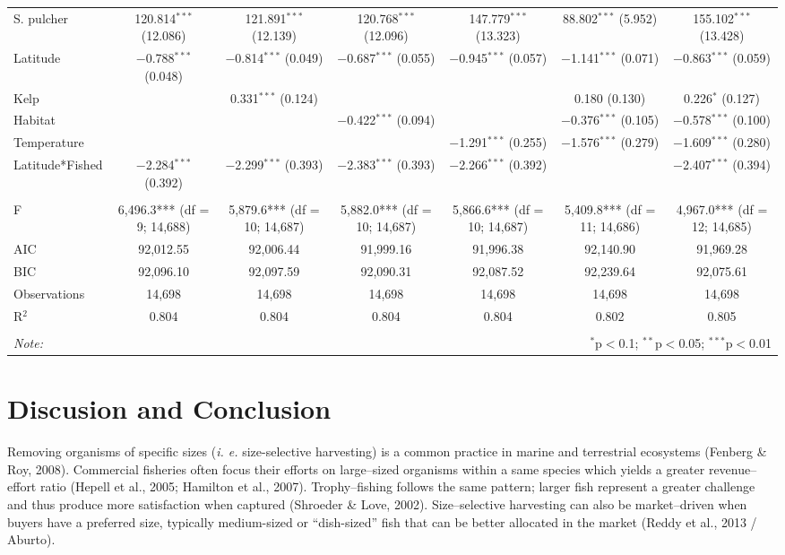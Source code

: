 \documentclass[12pt,]{article}
\begin{document}
\begin{landscape}
\begin{table}[!htbp]
\begin{tabular}{@{\extracolsep{5pt}}lcccccc}
  S. pulcher & 120.814$^{***}$ (12.086) & 121.891$^{***}$ (12.139) & 120.768$^{***}$ (12.096) & 147.779$^{***}$ (13.323) & 88.802$^{***}$ (5.952) & 155.102$^{***}$ (13.428) \\ 
  Latitude & $-$0.788$^{***}$ (0.048) & $-$0.814$^{***}$ (0.049) & $-$0.687$^{***}$ (0.055) & $-$0.945$^{***}$ (0.057) & $-$1.141$^{***}$ (0.071) & $-$0.863$^{***}$ (0.059) \\ 
  Kelp &  & 0.331$^{***}$ (0.124) &  &  & 0.180 (0.130) & 0.226$^{*}$ (0.127) \\ 
  Habitat &  &  & $-$0.422$^{***}$ (0.094) &  & $-$0.376$^{***}$ (0.105) & $-$0.578$^{***}$ (0.100) \\ 
  Temperature &  &  &  & $-$1.291$^{***}$ (0.255) & $-$1.576$^{***}$ (0.279) & $-$1.609$^{***}$ (0.280) \\ 
  Latitude*Fished & $-$2.284$^{***}$ (0.392) & $-$2.299$^{***}$ (0.393) & $-$2.383$^{***}$ (0.393) & $-$2.266$^{***}$ (0.392) &  & $-$2.407$^{***}$ (0.394) \\ 
 \hline \\[-1.8ex] 
F & 6,496.3*** (df = 9; 14,688) & 5,879.6*** (df = 10; 14,687) & 5,882.0*** (df = 10; 14,687) & 5,866.6*** (df = 10; 14,687) & 5,409.8*** (df = 11; 14,686) & 4,967.0*** (df = 12; 14,685) \\ 
AIC & 92,012.55 & 92,006.44 & 91,999.16 & 91,996.38 & 92,140.90 & 91,969.28 \\ 
BIC & 92,096.10 & 92,097.59 & 92,090.31 & 92,087.52 & 92,239.64 & 92,075.61 \\ 
Observations & 14,698 & 14,698 & 14,698 & 14,698 & 14,698 & 14,698 \\ 
R$^{2}$ & 0.804 & 0.804 & 0.804 & 0.804 & 0.802 & 0.805 \\ 
\hline 
\hline \\[-1.8ex] 
\textit{Note:}  & \multicolumn{6}{r}{$^{*}$p$<$0.1; $^{**}$p$<$0.05; $^{***}$p$<$0.01} \\ 
\end{tabular} 
\end{table} 

\end{landscape}

\clearpage

\section{Discusion and Conclusion}\label{discusion-and-conclusion}

Removing organisms of specific sizes (\emph{i. e.} size-selective
harvesting) is a common practice in marine and terrestrial ecosystems
(Fenberg \& Roy, 2008). Commercial fisheries often focus their efforts
on large--sized organisms within a same species which yields a greater
revenue--effort ratio (Hepell et al., 2005; Hamilton et al., 2007).
Trophy--fishing follows the same pattern; larger fish represent a
greater challenge and thus produce more satisfaction when captured
(Shroeder \& Love, 2002). Size--selective harvesting can also be
market--driven when buyers have a preferred size, typically medium-sized
or ``dish-sized'' fish that can be better allocated in the market (Reddy
et al., 2013 / Aburto).
\end{document}

